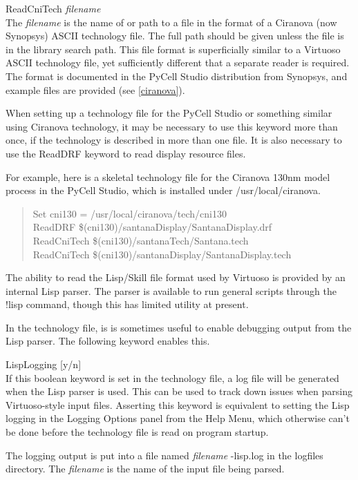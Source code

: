\begin{description}
\item{\vt ReadCniTech} {\it filename}\\
The {\it filename} is the name of or path to a file in the format
of a Ciranova (now Synopsys) ASCII technology file.  The full path
should be given unless the file is in the library
search path.  This file format is
superficially similar to a Virtuoso ASCII technology file, yet
sufficiently different that a separate reader is required.  The
format is documented in the PyCell Studio distribution from
Synopsys, and example files are provided (see \ref{ciranova}).

When setting up a technology file for the PyCell Studio or something
similar using Ciranova technology, it may be necessary to use this
keyword more than once, if the technology is described in more than
one file.  It is also necessary to use the {\vt ReadDRF} keyword to
read display resource files.

For example, here is a skeletal technology file for the Ciranova
130nm model process in the PyCell Studio, which is installed under
{\vt /usr/local/ciranova}.

\begin{quote} \vt
Set cni130 = /usr/local/ciranova/tech/cni130\\
ReadDRF \$(cni130)/santanaDisplay/SantanaDisplay.drf\\
ReadCniTech \$(cni130)/santanaTech/Santana.tech\\
ReadCniTech \$(cni130)/santanaDisplay/SantanaDisplay.tech
\end{quote}
\end{description}

The ability to read the Lisp/Skill file format used by Virtuoso is
provided by an internal Lisp parser.  The parser is available to run
general scripts through the {\cb !lisp} command, though this has
limited utility at present.

In the technology file, is is sometimes useful to enable debugging
output from the Lisp parser.  The following keyword enables this.

\begin{description}
\item{\vt LispLogging} [{\vt y/n}]\\
If this boolean keyword is set in the technology file, a log file will
be generated when the Lisp parser is used.  This can be used to track
down issues when parsing Virtuoso-style input files.  Asserting this
keyword is equivalent to setting the Lisp logging in the {\cb Logging
Options} panel from the {\cb Help Menu}, which otherwise can't be done
before the technology file is read on program startup.

The logging output is put into a file named {\it filename\/}{\vt
-lisp.log} in the logfiles directory.  The {\it filename} is the name
of the input file being parsed.
\end{description}


